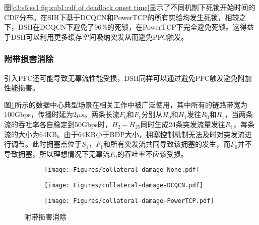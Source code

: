 图\ref{c3:s6:ss1:fig:sub1:cdf of deadlock onset time}显示了不同机制下死锁开始时间的CDF分布。在SIH下基于DCQCN\cite{SIGCOMM15DCQCN}和PowerTCP\cite{NSDI22PowerTCP}的所有实验均发生死锁，相较之下，DSH在DCQCN下避免了96\%的死锁，在PowerTCP下完全避免死锁。这得益于DSH可以利用更多缓存空间吸纳突发从而避免PFC触发。

\subsubsection{附带损害消除}

引入PFC还可能导致无辜流性能受损\cite{SIGCOMM16RDMA}，DSH同样可以通过避免PFC触发避免附加性能损害。

图\ref{c3:s6:ss1:fig:sub1:collateral damage scenario}所示的数据中心典型场景在相关工作中被广泛使用\cite{NSDI20PCN,SIGCOMM17NDP,SIGCOMM21TCD}，其中所有的链路带宽为100Gbps，传播时延为$2 \mu s$。两条长流$F_0$和$F_1$分别从$H_0$和$H_1$发往$R_0$和$R_1$，当两条流的吞吐率各自稳定到50Gbps时，$H_2-H_{25}$同时生成24条突发流量发往$R_1$，每条流的大小为64KB。由于64KB小于BDP大小，拥塞控制机制无法及时对突发流进行调节。此时拥塞点位于$S_1$，$F_1$和所有突发流共同导致该拥塞的发生，而$F_0$并不导致拥塞，所以理想情况下无辜流$F_0$的吞吐率不应该受损。

\begin{figure}[H]
  \begin{subfigure}[b]{0.49\linewidth}
      \centering
      \resizebox{\linewidth}{!}{}
      \label{c3:s6:ss1:fig:sub1:collateral damage scenario}
  \end{subfigure}
  \begin{subfigure}[b]{0.49\linewidth}
      \centering
      \texttt{[image: Figures/collateral-damage-None.pdf]}
      \label{c3:s6:ss1:fig:sub1:throughput of f0 w/o cc}
  \end{subfigure}
  \begin{subfigure}[b]{0.49\linewidth}
    \centering
    \texttt{[image: Figures/collateral-damage-DCQCN.pdf]}
    \label{c3:s6:ss1:fig:sub1:throughput of f0 dcqcn}
  \end{subfigure}
  \begin{subfigure}[b]{0.49\linewidth}
    \centering
    \texttt{[image: Figures/collateral-damage-PowerTCP.pdf]}
    \label{c3:s6:ss1:fig:sub2:collateral throughput of f0 powertcp}
  \end{subfigure}  
  \caption{附带损害消除}
  \label{c3:s6:ss1:fig:collateral damage}
\end{figure}

